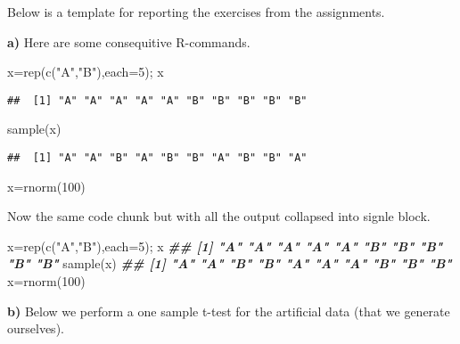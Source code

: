 \documentclass[
  11pt,
]{article}
\newenvironment{Shaded}{\begin{snugshade}}{\end{snugshade}}
\newcommand{\AttributeTok}[1]{\textcolor[rgb]{0.77,0.63,0.00}{#1}}
\newcommand{\DecValTok}[1]{\textcolor[rgb]{0.00,0.00,0.81}{#1}}
\newcommand{\DocumentationTok}[1]{\textcolor[rgb]{0.56,0.35,0.01}{\textbf{\textit{#1}}}}
\newcommand{\FunctionTok}[1]{\textcolor[rgb]{0.00,0.00,0.00}{#1}}
\newcommand{\NormalTok}[1]{#1}
\newcommand{\OtherTok}[1]{\textcolor[rgb]{0.56,0.35,0.01}{#1}}
\newcommand{\StringTok}[1]{\textcolor[rgb]{0.31,0.60,0.02}{#1}}
\begin{document}
Below is a template for reporting the exercises from the assignments.

\textbf{a)} Here are some consequitive R-commands.

\begin{Shaded}
\begin{Highlighting}[]
\NormalTok{x}\OtherTok{=}\FunctionTok{rep}\NormalTok{(}\FunctionTok{c}\NormalTok{(}\StringTok{"A"}\NormalTok{,}\StringTok{"B"}\NormalTok{),}\AttributeTok{each=}\DecValTok{5}\NormalTok{); x}
\end{Highlighting}
\end{Shaded}

\begin{verbatim}
##  [1] "A" "A" "A" "A" "A" "B" "B" "B" "B" "B"
\end{verbatim}

\begin{Shaded}
\begin{Highlighting}[]
\FunctionTok{sample}\NormalTok{(x)}
\end{Highlighting}
\end{Shaded}

\begin{verbatim}
##  [1] "A" "A" "B" "A" "B" "B" "A" "B" "B" "A"
\end{verbatim}

\begin{Shaded}
\begin{Highlighting}[]
\NormalTok{x}\OtherTok{=}\FunctionTok{rnorm}\NormalTok{(}\DecValTok{100}\NormalTok{)}
\end{Highlighting}
\end{Shaded}

Now the same code chunk but with all the output collapsed into signle
block.

\begin{Shaded}
\begin{Highlighting}[]
\NormalTok{x}\OtherTok{=}\FunctionTok{rep}\NormalTok{(}\FunctionTok{c}\NormalTok{(}\StringTok{"A"}\NormalTok{,}\StringTok{"B"}\NormalTok{),}\AttributeTok{each=}\DecValTok{5}\NormalTok{); x}
\DocumentationTok{\#\#  [1] "A" "A" "A" "A" "A" "B" "B" "B" "B" "B"}
\FunctionTok{sample}\NormalTok{(x)}
\DocumentationTok{\#\#  [1] "A" "A" "B" "B" "A" "A" "A" "B" "B" "B"}
\NormalTok{x}\OtherTok{=}\FunctionTok{rnorm}\NormalTok{(}\DecValTok{100}\NormalTok{)}
\end{Highlighting}
\end{Shaded}

\textbf{b)} Below we perform a one sample t-test for the artificial data
(that we generate ourselves).
\end{document}
